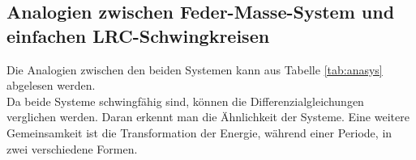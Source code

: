 \documentclass[a4paper,usenatbib]{aspdoc}
\begin{document}
        \subsection{Analogien zwischen Feder-Masse-System und einfachen LRC-Schwingkreisen}
            Die Analogien zwischen den beiden Systemen kann aus Tabelle \ref{tab:anasys} abgelesen werden. \\
            Da beide Systeme schwingfähig sind, können die Differenzialgleichungen verglichen werden. Daran erkennt man die Ähnlichkeit der Systeme. Eine weitere Gemeinsamkeit ist die Transformation der Energie, während einer Periode, in zwei verschiedene Formen.
            \begin{table}
                    \begin{center}
                    \end{center}
                    \caption{Analogien zwischen Feder-Masse-System und einfachen LRC-Schwingkreisen}
                    \label{tab:anasys}
                \end{table}
       
\end{document}

